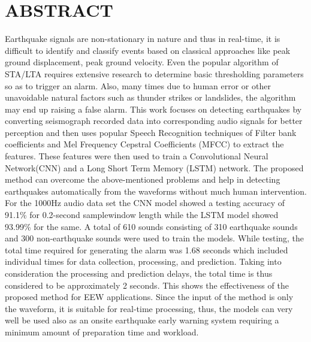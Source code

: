 \documentclass[a4paper,12pt]{report}
\begin{document}
\chapter*{ABSTRACT}
\vspace{1cm}

\fontsize{12pt}{18pt}\selectfont
Earthquake signals are non-stationary in nature and thus in real-time, it is difficult to identify and classify events based on classical approaches like peak ground displacement, peak ground velocity. Even the popular algorithm of STA/LTA requires extensive research to determine basic thresholding parameters so as to trigger an alarm. Also, many times due to human error or other unavoidable natural factors such as thunder strikes or landslides, the algorithm may end up raising a false alarm. This work focuses on detecting earthquakes by converting seismograph recorded data into corresponding audio signals for better perception and then uses popular Speech Recognition techniques of Filter bank coefficients and Mel Frequency Cepstral Coefficients (MFCC) to extract the features. These features
were then used to train a Convolutional Neural Network(CNN) and a Long Short Term Memory
(LSTM) network. The proposed method can overcome the above-mentioned problems and help in
detecting earthquakes automatically from the waveforms without much human intervention. For the 1000Hz audio data set the CNN model showed a testing accuracy of 91.1\% for 0.2-second samplewindow length while the LSTM model showed 93.99\% for the same. A total of 610 sounds consisting of 310 earthquake sounds and 300 non-earthquake sounds were used to train the models. While testing, the total time required for generating the alarm was 1.68 seconds which included individual times for data collection, processing, and prediction. Taking into consideration the processing and prediction delays, the total time is thus considered to be approximately 2 seconds. This shows the effectiveness of the proposed method for EEW applications. Since the input of the method is only the waveform, it is suitable for real-time processing, thus, the models can very well be used also as an onsite earthquake early warning system requiring a minimum amount of preparation time and workload.

\newpage
\tableofcontents
\newpage
{}
\begingroup
\let\cleardoublepage\clearpage
\listoffigures
\endgroup
\end{document}
